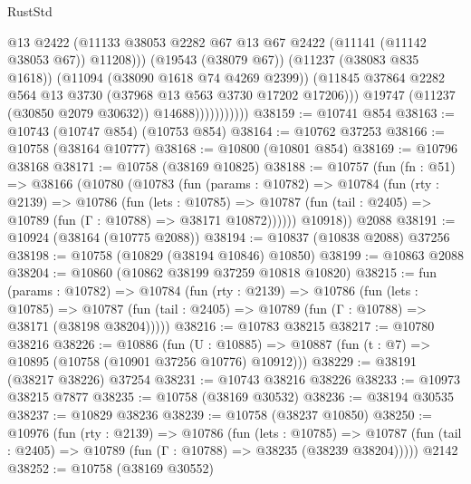 \begin{lexlean}{RustStd}
\begin{coremodule}
                                @13
                                @2422
                                (@11133
                                  @38053
                                  @2282
                                  @67
                                  @13
                                  @67
                                  @2422
                                  (@11141 (@11142 @38053 @67))
                                  @11208)))
                            (@19543 (@38079 @67))
                            (@11237 (@38083 @835 @1618))
                            (@11094 (@38090 @1618 @74 @4269 @2399))
                            (@11845
                              @37864
                              @2282
                              @564
                              @13
                              @3730
                              (@37968 @13 @563 @3730 @17202 @17206)))
                          @19747
                          (@11237 (@30850 @2079 @30632))
                          @14688)))))))))))
@38159 := @10741 @854
@38163 := @10743 (@10747 @854) (@10753 @854)
@38164 := @10762 @37253
@38166 := @10758 (@38164 @10777)
@38168 := @10800 (@10801 @854)
@38169 := @10796 @38168
@38171 := @10758 (@38169 @10825)
@38188 := @10757
    (fun (fn : @51) =>
    @38166
      (@10780
        (@10783
          (fun (params : @10782) =>
          @10784
            (fun (rty : @2139) =>
            @10786
              (fun (lets : @10785) =>
              @10787 (fun (tail : @2405) => @10789 (fun (Γ : @10788) => @38171 @10872))))))
        @10918))
    @2088
@38191 := @10924 (@38164 (@10775 @2088))
@38194 := @10837 (@10838 @2088) @37256
@38198 := @10758 (@10829 (@38194 @10846) @10850)
@38199 := @10863 @2088
@38204 := @10860 (@10862 @38199 @37259 @10818 @10820)
@38215 := fun (params : @10782) =>
  @10784
    (fun (rty : @2139) =>
    @10786
      (fun (lets : @10785) =>
      @10787 (fun (tail : @2405) => @10789 (fun (Γ : @10788) => @38171 (@38198 @38204)))))
@38216 := @10783 @38215
@38217 := @10780 @38216
@38226 := @10886
    (fun (U : @10885) => @10887 (fun (t : @7) => @10895 (@10758 (@10901 @37256 @10776) @10912)))
@38229 := @38191 (@38217 @38226) @37254
@38231 := @10743 @38216 @38226
@38233 := @10973 @38215 @7877
@38235 := @10758 (@38169 @30532)
@38236 := @38194 @30535
@38237 := @10829 @38236
@38239 := @10758 (@38237 @10850)
@38250 := @10976
    (fun (rty : @2139) =>
    @10786
      (fun (lets : @10785) =>
      @10787 (fun (tail : @2405) => @10789 (fun (Γ : @10788) => @38235 (@38239 @38204)))))
    @2142
@38252 := @10758 (@38169 @30552)

\end{coremodule}
\end{lexlean}
